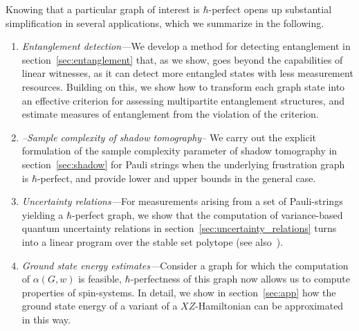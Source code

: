 \documentclass[
12pt,
prx,
aps,
reprint,
a4paper,
longbibliograph,
nofootinbib,
nobibnotes,
superscriptaddress
]{revtex4-2}
\theoremstyle{definition}
\def\rs#1{{\color{blue}#1}}%
\begin{document}
Knowing that a particular graph of interest is  $\hbar$-perfect opens up substantial simplification in several applications, which we summarize in the following.
\begin{enumerate}
    \item \emph{Entanglement detection---}We develop a method for detecting entanglement in section~\ref{sec:entanglement} that, as we show, goes beyond the capabilities of linear witnesses, as it can detect more entangled states with less measurement resources. Building on this, we show how to  transform each graph state into an effective criterion for assessing multipartite entanglement structures, and estimate measures of entanglement from the violation of the criterion.
    \item \emph{--Sample complexity of shadow tomography--} We carry out the explicit formulation of the sample complexity parameter of shadow tomography in section~\ref{sec:shadow} for Pauli strings when the underlying frustration graph is $\hbar$-perfect, and provide lower and upper bounds in the general case. 
    \item \emph{Uncertainty relations---}For measurements arising from a set of Pauli-strings yielding a $\hbar$-perfect graph, we show that the computation of variance-based quantum uncertainty relations in section~\ref{sec:uncertainty_relations} turns into a linear program over the stable set polytope (see also~\cite{schwonnek2018uncertainty,kaniewski2019maximal}).  
    \item \emph{Ground state energy estimates---}Consider a graph for which the computation of $\alpha(G,w)$ is feasible, $\hbar$-perfectness of this graph now allows us to compute properties of spin-systems. In detail, we show in section~\ref{sec:app} how the ground state energy of a variant of a $XZ$-Hamiltonian can be approximated in this way. %


\end{enumerate}
\end{document}
